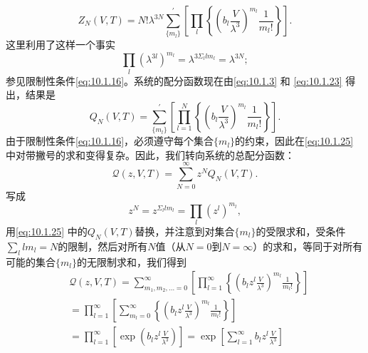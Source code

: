 \begin{equation}\tag{10.1.23}\label{eq:10.1.23}
Z _ { N } ( V , T ) = N ! \lambda ^{3 N} \sum _ { \{ m _ { l } \} } ^{\prime} \left[ \prod _ { l } \left\{ \left( b _ { l } \frac { V } { \lambda ^{3} } \right) ^{m _ { l} } \frac { 1 } { m _ { l } ! } \right\} \right] .
\end{equation}
这里利用了这样一个事实
\begin{equation}\tag{10.1.24}\label{eq:10.1.24}
\prod _ { l } ( \lambda ^{3 l} ) ^{m _ { l} } = \lambda ^{3 \Sigma _ { l} l m _ { l } } = \lambda ^{3 N} ;
\end{equation}
参见限制性条件\autoref{eq:10.1.16}。系统的配分函数现在由\autoref{eq:10.1.3} 和 \autoref{eq:10.1.23} 得出，结果是
\begin{equation}\tag{10.1.25}\label{eq:10.1.25}
Q _ { N } ( V , T ) = \sum _ { \{ m _ { l } \} } ^{\prime} \left[ \prod _ { l = 1 } ^{N} \left\{ \left( b _ { l } \frac { V } { \lambda ^{3} } \right) ^{m _ { l} } \frac { 1 } { m _ { l } ! } \right\} \right] .
\end{equation}
由于限制性条件\autoref{eq:10.1.16}，必须遵守每个集合\(\{m_l\}\)的约束，因此在\autoref{eq:10.1.25} 中对带撇号的求和变得复杂。因此，我们转向系统的总配分函数：
\begin{equation}\tag{10.1.26}\label{eq:10.1.26}
\mathcal { Q } ( z , V , T ) = \sum _ { N = 0 } ^{\infty} z ^{N} Q _ { N } ( V , T ) .
\end{equation}
写成
\begin{equation}\tag{10.1.27}\label{eq:10.1.27}
z ^{N} = z ^{\Sigma _ { l} l m _ { l } } = \prod _ { l } ( z ^{l} ) ^{m _ { l} } ,
\end{equation}
用\autoref{eq:10.1.25} 中的\(Q_{N}(V,T)\)替换，并注意到对集合\(\{m_{l}\}\)的受限求和，受条件\(\sum_{l}lm_{l}=N\)的限制，然后对所有\(N\)值（从\(N=0\)到\(N=\infty\)）的求和，等同于对所有可能的集合\(\{m_{l}\}\)的无限制求和，我们得到
\begin{equation}\tag{10.1.28}\label{eq:10.1.28}
\begin{array}{rl} & { \mathcal { Q } ( z , V , T ) = \displaystyle \sum _ { m _ { 1 } , m _ { 2 } , \ldots = 0 } ^{\infty} \left[ \displaystyle \prod _ { l = 1 } ^{\infty} \left\{ \left( b _ { l } z ^{l} \frac { V } { \lambda ^{3} } \right) ^{m _ { l} } \frac { 1 } { m _ { l } ! } \right\} \right] } \\& {  = \displaystyle \prod _ { l = 1 } ^{\infty} \left[ \displaystyle \sum _ { m _ { l } = 0 } ^{\infty} \left\{ \left( b _ { l } z ^{l} \frac { V } { \lambda ^{3} } \right) ^{m _ { l} } \frac { 1 } { m _ { l } ! } \right\} \right] } \\& {  = \displaystyle \prod _ { l = 1 } ^{\infty} \left[ \exp \left( b _ { l } z ^{l} \frac { V } { \lambda ^{3} } \right) \right] = \exp \left[ \displaystyle \sum _ { l = 1 } ^{\infty} b _ { l } z ^{l} \frac { V } { \lambda ^{3} } \right] } \end{array}
\end{equation}
